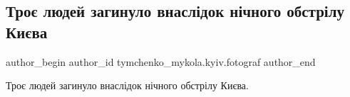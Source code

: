  
 
 
 
 

\subsection{Троє людей загинуло внаслідок нічного обстрілу Києва}
\label{sec:01_06_2023.fb.tymchenko_mykola.kyiv.fotograf.1.troje_ludej_zagynulo_obstril_kiev}

\ifcmt
 author_begin
   author_id tymchenko_mykola.kyiv.fotograf
 author_end
\fi

Троє людей загинуло внаслідок нічного обстрілу Києва.
